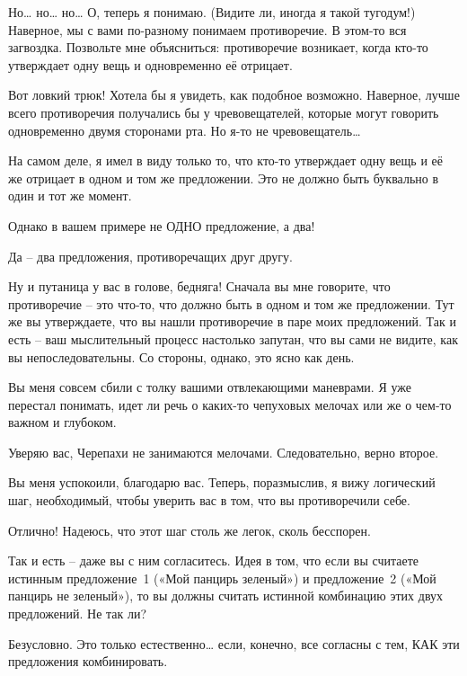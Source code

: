 \documentclass[../main.tex]{subfiles}
\begin{document}
\begin{dialogue}
 Но\ldots{} но\ldots{} но\ldots{} О, теперь я понимаю. (Видите ли, иногда я такой тугодум!) Наверное, мы с вами по-разному понимаем противоречие. В этом-то вся загвоздка. Позвольте мне объясниться: противоречие возникает, когда кто-то утверждает одну вещь и одновременно её отрицает.

 Вот ловкий трюк! Хотела бы я увидеть, как подобное возможно. Наверное, лучше всего противоречия получались бы у чревовещателей, которые могут говорить одновременно двумя сторонами рта. Но я-то не чревовещатель\ldots{}

 На самом деле, я имел в виду только то, что кто-то утверждает одну вещь и её же отрицает в одном и том же предложении. Это не должно быть буквально в один и тот же момент.

 Однако в вашем примере не ОДНО предложение, а два!

 Да \--- два предложения, противоречащих друг другу.

 Ну и путаница у вас в голове, бедняга! Сначала вы мне говорите, что противоречие \--- это что-то, что должно быть в одном и том же предложении. Тут же вы утверждаете, что вы нашли противоречие в паре моих предложений. Так и есть \--- ваш мыслительный процесс настолько запутан, что вы сами не видите, как вы непоследовательны. Со стороны, однако, это ясно как день.

 Вы меня совсем сбили с толку вашими отвлекающими маневрами. Я уже перестал понимать, идет ли речь о каких-то чепуховых мелочах или же о чем-то важном и глубоком.

 Уверяю вас, Черепахи не занимаются мелочами. Следовательно, верно второе.

 Вы меня успокоили, благодарю вас. Теперь, поразмыслив, я вижу логический шаг, необходимый, чтобы уверить вас в том, что вы противоречили себе.

 Отлично! Надеюсь, что этот шаг столь же легок, сколь бесспорен.

 Так и есть \--- даже вы с ним согласитесь. Идея в том, что если вы считаете истинным предложение~1 («Мой панцирь зеленый») и предложение~2 («Мой панцирь не зеленый»), то вы должны считать истинной комбинацию этих двух предложений. Не так ли?

 Безусловно. Это только естественно\ldots{} если, конечно, все согласны с тем, КАК эти предложения комбинировать.


\end{dialogue}
\end{document}
